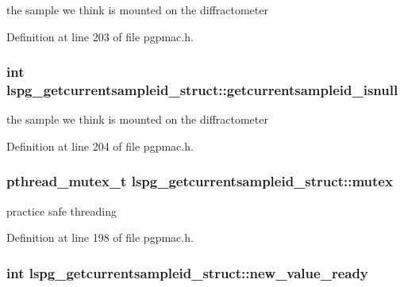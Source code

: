the sample we think is mounted on the diffractometer 



Definition at line 203 of file pgpmac.\-h.

\hypertarget{structlspg__getcurrentsampleid__struct_af370f8d1aaec7dd15121dc65d2a6cfc1}{
\subsubsection[{getcurrentsampleid\-\_\-isnull}]{\setlength{\rightskip}{0pt plus 5cm}int lspg\-\_\-getcurrentsampleid\-\_\-struct\-::getcurrentsampleid\-\_\-isnull}}\label{structlspg__getcurrentsampleid__struct_af370f8d1aaec7dd15121dc65d2a6cfc1}


the sample we think is mounted on the diffractometer 



Definition at line 204 of file pgpmac.\-h.

\hypertarget{structlspg__getcurrentsampleid__struct_ace54acbdcbce620437962858ba04e256}{
\subsubsection[{mutex}]{\setlength{\rightskip}{0pt plus 5cm}pthread\-\_\-mutex\-\_\-t lspg\-\_\-getcurrentsampleid\-\_\-struct\-::mutex}}\label{structlspg__getcurrentsampleid__struct_ace54acbdcbce620437962858ba04e256}


practice safe threading 



Definition at line 198 of file pgpmac.\-h.

\hypertarget{structlspg__getcurrentsampleid__struct_ada3840f03195ee1807150f1e75fd3775}{
\subsubsection[{new\-\_\-value\-\_\-ready}]{\setlength{\rightskip}{0pt plus 5cm}int lspg\-\_\-getcurrentsampleid\-\_\-struct\-::new\-\_\-value\-\_\-ready}}\label{structlspg__getcurrentsampleid__struct_ada3840f03195ee1807150f1e75fd3775}


